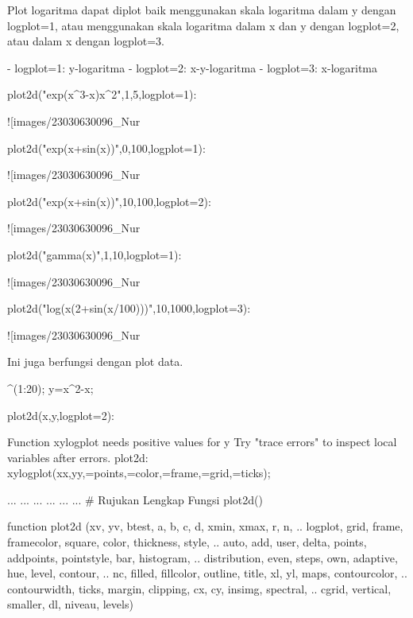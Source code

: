\documentclass{article}
\begin{document}
Plot logaritma dapat diplot baik menggunakan skala logaritma dalam y
dengan logplot=1, atau menggunakan skala logaritma dalam x dan y
dengan logplot=2, atau dalam x dengan logplot=3.


  - logplot=1: y-logaritma  
  - logplot=2: x-y-logaritma  
  - logplot=3: x-logaritma  

\>plot2d("exp(x^3-x)\*x^2",1,5,logplot=1):


![images/23030630096_Nur%

\>plot2d("exp(x+sin(x))",0,100,logplot=1):


![images/23030630096_Nur%

\>plot2d("exp(x+sin(x))",10,100,logplot=2):


![images/23030630096_Nur%

\>plot2d("gamma(x)",1,10,logplot=1):


![images/23030630096_Nur%

\>plot2d("log(x\*(2+sin(x/100)))",10,1000,logplot=3):


![images/23030630096_Nur%

Ini juga berfungsi dengan plot data.


^(1:20); y=x^2-x;

\>plot2d(x,y,logplot=2):


    Function xylogplot needs positive values for y
    Try "trace errors" to inspect local variables after errors.
    plot2d:
        xylogplot(xx,yy,=points,=color,=frame,=grid,=ticks);

\>...  
\>   ...  
\>   ...  
\>   ...  
\>   ...  
\>   ...  
\>  
# Rujukan Lengkap Fungsi plot2d()

  function plot2d (xv, yv, btest, a, b, c, d, xmin, xmax, r, n,  ..  
  logplot, grid, frame, framecolor, square, color, thickness, style, ..  
  auto, add, user, delta, points, addpoints, pointstyle, bar, histogram,  ..  
  distribution, even, steps, own, adaptive, hue, level, contour,  ..  
  nc, filled, fillcolor, outline, title, xl, yl, maps, contourcolor, ..  
  contourwidth, ticks, margin, clipping, cx, cy, insimg, spectral,  ..  
  cgrid, vertical, smaller, dl, niveau, levels)  
\end{document}
